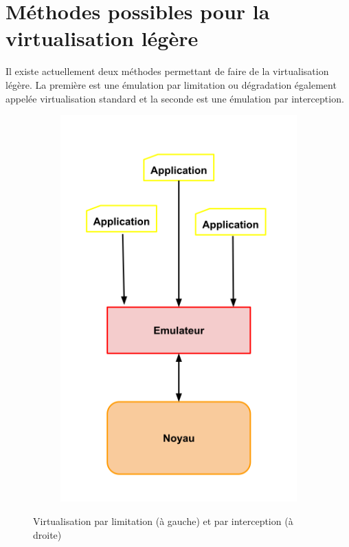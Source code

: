 \section{Méthodes possibles pour la virtualisation légère}
\label{section:emulation}

Il existe actuellement deux méthodes permettant de faire de la virtualisation
légère. La première est une émulation par limitation ou dégradation également
appelée virtualisation standard et la seconde est une émulation par
interception.

\begin{figure}[H]
  \centering %
  \begin{subfigure}{0.3\textwidth}
    \includegraphics[scale=0.35]{Pictures/png/Virtualisation_limitation}
  \end{subfigure}
  \begin{subfigure}{0.3\textwidth}
  \end{subfigure}
  \caption{Virtualisation par limitation (à gauche) et par interception (à
    droite)}
  \label{TYPE_VIRTUALISATION}
\end{figure}


